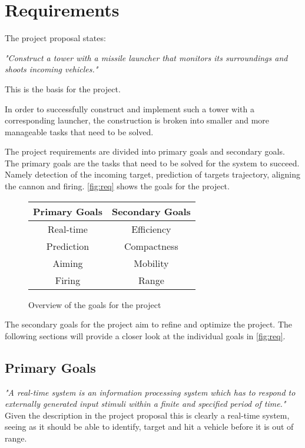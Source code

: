 \section{Requirements}
The project proposal states: 

\emph{"Construct a tower with a missile launcher that monitors its surroundings and shoots incoming vehicles."} 

This is the basis for the project.

In order to successfully construct and implement such a tower with a corresponding launcher, the construction is broken into smaller and more manageable tasks that need to be solved.

The project requirements are divided into primary goals and secondary goals. The primary goals are the tasks that need to be solved for the system to succeed. Namely detection of the incoming target, prediction of targets trajectory, aligning the cannon and firing. \autoref{fig:req} shows the goals for the project.

\begin{figure}[hptb]
\centering
\begin{tabular}{ c c}
\textbf{Primary Goals} & \textbf{Secondary Goals}\\ [0.5ex]
\hline
Real-time &   Efficiency\\
Prediction&	Compactness\\
Aiming	  &	Mobility\\
Firing    &   Range\\[1ex]
\hline
\end{tabular}
\caption{Overview of the goals for the project}
\label{fig:req}
\end{figure}

The secondary goals for the project aim to refine and optimize the project. 
The following sections will provide a closer look at the individual goals in \autoref{fig:req}.


\subsection{Primary Goals} %
\label{sub:real_time_aspects}
\emph{"A real-time system is an information processing system which has to
respond to externally generated input stimuli within a finite and specified
period of time."\cite{realtime}}\\

Given the description in the project proposal this is clearly a real-time system, seeing as it should be able to identify, target and hit a vehicle before it is out of range. 

